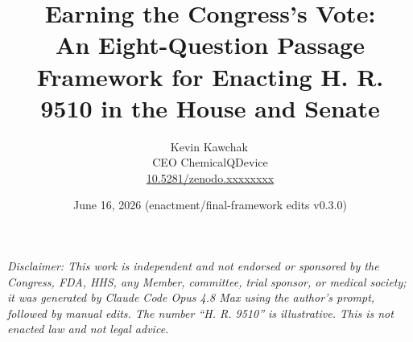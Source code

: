 \documentclass[11pt]{article}
\title{Earning the Congress's Vote:\\An Eight-Question Passage Framework for Enacting H. R. 9510 in the House and Senate}
\author{Kevin Kawchak\,\orcidicon{0009-0007-5457-8667}\\ CEO ChemicalQDevice\\ \href{https://doi.org/10.5281/zenodo.xxxxxxxx}{10.5281/zenodo.xxxxxxxx}}
\date{June 16, 2026 (enactment/final-framework edits v0.3.0)}
\begin{document}
\maketitle
\thispagestyle{empty}

\begin{abstract}

\end{abstract}

\vspace{0.2em}\noindent\footnotesize\textit{Disclaimer: This work is independent and
not endorsed or sponsored by the Congress, FDA, HHS, any Member, committee, trial
sponsor, or medical society; it was generated by Claude Code Opus 4.8 Max using the
author's prompt, followed by manual edits. The number ``H. R. 9510'' is
illustrative. This is not enacted law and not legal advice.}\normalsize\par




\tableofcontents
\vspace{0.3cm}










\clearpage


\clearpage
{}
\begingroup\raggedright\nocite{*}\endgroup


\end{document}
